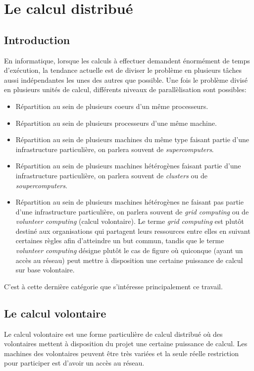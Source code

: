 \documentclass[a4paper, 12pt]{report}
\begin{document}
\minitoc

\section{Le calcul distribué}
\label{calculdistribue}
\subsection{Introduction}
En informatique, lorsque les calculs à effectuer demandent énormément de temps d'exécution, la tendance actuelle est de diviser le problème en plusieurs tâches aussi indépendantes les unes des autres que possible. Une fois le problème divisé en plusieurs unités de calcul, différents niveaux de parallèlisation sont possibles:
\begin{itemize}
\item Répartition au sein de plusieurs coeurs d'un même processeurs. %
\item Répartition au sein de plusieurs processeurs d'une même machine. %
\item Répartition au sein de plusieurs machines du même type faisant partie d'une infrastructure particulière, on parlera souvent de \textit{supercomputers}.
\item Répartition au sein de plusieurs machines hétérogènes faisant partie d'une infrastructure particulière, on parlera souvent de \textit{clusters} ou de \textit{soupercomputers}.
\item Répartition au sein de plusieurs machines hétérogènes ne faisant pas partie d'une infrastructure particulière, on parlera souvent de \textit{grid computing} ou de \textit{volunteer computing} (calcul volontaire). Le terme \textit{grid computing} est plutôt destiné aux organisations qui partagent leurs ressources entre elles en suivant certaines règles afin d'atteindre un but commun, tandis que le terme \textit{volunteer computing} désigne plutôt le cas de figure où quiconque (ayant un accès au réseau) peut mettre à disposition une certaine puissance de calcul sur base volontaire.
\end{itemize}
C'est à cette dernière catégorie que s'intéresse principalement ce travail. 

\subsection{Le calcul volontaire}
\label{calculvolontaire}
Le calcul volontaire est une forme particulière de calcul distribué où des volontaires mettent à disposition du projet une certaine puissance de calcul. Les machines des volontaires peuvent être très variées et la seule réelle restriction pour participer est d'avoir un accès au réseau. 
\end{document}
